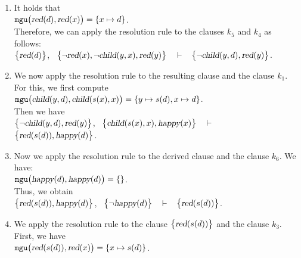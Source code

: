\begin{enumerate}
\item It holds that
      \\[0.2cm]
      \hspace*{1.3cm}
      $\mathtt{mgu}\bigl(\textsl{red}(d), \textsl{red}(x)\bigr) = \{x \mapsto d\}$.
      \\[0.2cm]
      Therefore, we can apply the resolution rule to the clauses $k_5$ and $k_4$ as follows:
      \\[0.2cm]
      \hspace*{1.3cm}
      $\bigl\{\textsl{red}(d)\bigl\}$, \ $\bigl\{\neg \textsl{red}(x), \neg \textsl{child}(y,x), \textsl{red}(y)\bigl\}$ \ $\vdash$ \ $\bigl\{\neg \textsl{child}(y,d), \textsl{red}(y)\bigl\}$.
\item We now apply the resolution rule to the resulting clause and the clause $k_1$. For this, we first compute
      \\[0.2cm]
      \hspace*{1.3cm}
      $\mathtt{mgu}\bigl(\textsl{child}(y,d), \textsl{child}(s(x),x)\bigr) = \{ y \mapsto s(d), x \mapsto d \}$.
      \\[0.2cm]
      Then we have
      \\[0.2cm]
      \hspace*{1.3cm}
       $\bigl\{\neg \textsl{child}(y,d), \textsl{red}(y)\bigl\}$, \ 
       $\bigl\{\textsl{child}(s(x),x), \textsl{happy}(x)\bigl\}$ \ $\vdash$ \ 
       $\bigl\{ \textsl{red}(s(d)), \textsl{happy}(d) \bigl\}$.
\item Now we apply the resolution rule to the derived clause and the clause $k_6$. We have:
      \\[0.2cm]
      \hspace*{1.3cm}
      $\mathtt{mgu}\bigl(\textsl{happy}(d), \textsl{happy}(d)\bigr) = \{\}$.
      \\[0.2cm]
      Thus, we obtain
      \\[0.2cm]
      \hspace*{1.3cm}
      $\bigl\{ \textsl{red}(s(d)), \textsl{happy}(d) \bigl\}$, \ $\bigl\{\neg \textsl{happy}(d)\bigl\}$ \ $\vdash$ \ $\bigl\{\textsl{red}(s(d))\bigl\}$.
\item We apply the resolution rule to the clause $\bigl\{\textsl{red}(s(d))\bigl\}$ and the clause $k_3$. First, we have
      \\[0.2cm]
      \hspace*{1.3cm}
      $\mathtt{mgu}\bigl(\textsl{red}(s(d)), \textsl{red}(x)\bigr) = \{ x \mapsto s(d) \}$.

\end{enumerate}
